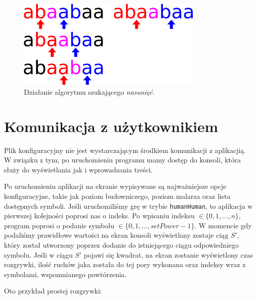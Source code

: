\documentclass[document]{xmgr}
\begin{document}
\begin{figure}[tbh]
    \centering
    \includegraphics[width = 0.8\textwidth]{images/overlapFinding}
    \caption{Działanie algorytmu szukającego \emph{nasunięć}.}
    \label{fig:overlapFinding}
\end{figure}

\section{Komunikacja z użytkownikiem}
Plik konfiguracyjny nie jest wystarczającym środkiem komunikacji z aplikacjią. W związku z tym, po uruchomieniu programu mamy dostęp do konsoli, która służy do wyświetlania jak i wprowadzania treści.

Po uruchomieniu aplikacji na ekranie wypisywane są najważniejsze op\-cje konfiguracyjne, takie jak poziom budowniczego, poziom malarza oraz lista dostępnych symboli. Jeśli uruchomiliśmy grę w trybie \texttt{humanHuman}, to aplikacja w pierwszej kolejności poprosi nas o indeks. Po wpisaniu indeksu  \mbox{$\in \{0, 1, ...,n\}$}, program poprosi o podanie symbolu \mbox{$\in \{0, 1, ..., setPower-1\}$}. W momencie gdy podaliśmy prawidłowe wartości na ekran konsoli wyświetlany zostaje ciąg $S'$, który został utworzony poprzez dodanie do istniejącego ciągu odpowiedniego symbolu. Jeśli w ciągu $S'$ pojawi się kwadrat, na ekran zostanie wyświetlony czas rozgrywki, ilość ruchów jaka została do tej pory wykonana oraz indeksy wraz z symbolami, wspomnianego powtórzenia.

Oto przykład prostej rozgrywki:
\end{document}
